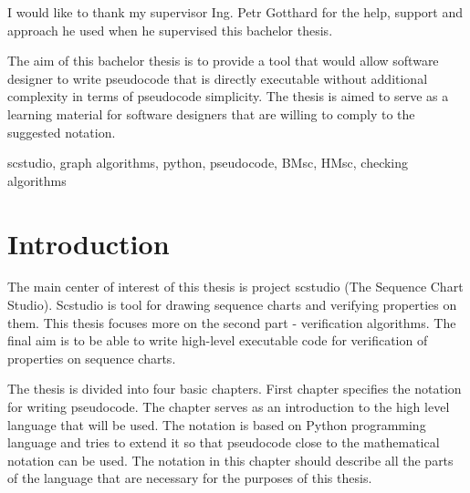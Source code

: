 \documentclass[11pt,oneside]{fithesis2}
\begin{document}
\lstset{language=Python,breaklines,stepnumber=1,numbers=right,numberstyle=\tiny,numbersep=5pt}
\FrontMatter  
\ThesisTitlePage  
 
\begin{ThesisDeclaration}  
\DeclarationText  
\AdvisorName  
\end{ThesisDeclaration}  
 
\begin{ThesisThanks}  
I would like to thank my supervisor Ing. Petr Gotthard for the help, support and approach he used when he supervised this bachelor thesis.
\end{ThesisThanks}  

\begin{ThesisAbstract}  
The aim of this bachelor thesis is to provide a tool that would allow software designer to write pseudocode that is directly executable without additional complexity in terms of pseudocode simplicity. The thesis is aimed to serve as a learning material for software designers that are willing to comply to the suggested notation.


\end{ThesisAbstract}  

\begin{ThesisKeyWords}  
scstudio, graph algorithms, python, pseudocode, BMsc, HMsc, checking algorithms
\end{ThesisKeyWords}  
 
\MainMatter  
\tableofcontents          %
 
\chapter{Introduction}    %
The main center of interest of this thesis is project scstudio (The Sequence Chart Studio)\cite{scstudio,scstudio2}. Scstudio is tool for drawing sequence charts and verifying properties on them. This thesis focuses more on the second part - verification algorithms. The final aim is to be able to write high-level executable code for verification of properties on sequence charts.

The thesis is divided into four basic chapters. First chapter specifies the notation for writing pseudocode. The chapter serves as an introduction to the high level language that will be used. The notation is based on Python\cite{python,python2} programming language and tries to extend it so that pseudocode close to the mathematical notation can be used. The notation in this chapter should describe all the parts of the language that are necessary for the purposes of this thesis.
\end{document}
